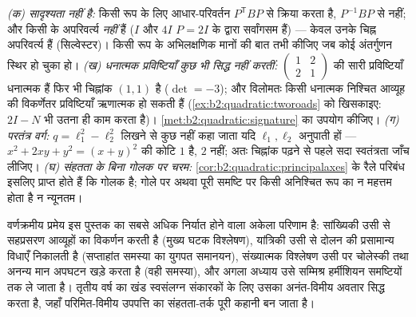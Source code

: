 \begin{remark}[सामान्य भूलें]
\emph{(क)  सादृश्यता नहीं है:} किसी रूप के लिए आधार-परिवर्तन
$P^{\mathsf T}BP$ से क्रिया करता है, $P^{-1}BP$ से नहीं; और  किसी  के
अपरिवर्त्य \emph{नहीं} हैं ($I$ और $4I$ $P = 2I$ के द्वारा सर्वांगसम हैं) ---
केवल उनके चिह्न अपरिवर्त्य हैं (सिल्वेस्टर)। किसी रूप के अभिलक्षणिक मानों
की बात तभी कीजिए जब कोई अंतर्गुणन स्थिर हो चुका हो। \emph{(ख) धनात्मक
प्रविष्टियाँ कुछ भी सिद्ध नहीं करतीं:} $\begin{pmatrix} 1 & 2\\ 2 & 1\end{pmatrix}$ की सारी प्रविष्टियाँ धनात्मक
हैं फिर भी चिह्नांक $(1,1)$ है ($\det = -3$); और विलोमतः किसी धनात्मक निश्चित आव्यूह
की विकर्णेतर प्रविष्टियाँ ऋणात्मक हो सकती हैं (\cref{ex:b2:quadratic:tworoads} को खिसकाइए: $2I - N$ भी उतना
ही काम करता है)। \cref{met:b2:quadratic:signature} का उपयोग कीजिए। \emph{(ग) परतंत्र वर्ग:} $q = \ell_1^2 - \ell_2^2$ लिखने
से कुछ नहीं कहा जाता यदि $\ell_1, \ell_2$ अनुपाती हों --- $x^2 + 2xy + y^2 =
(x+y)^2$ की कोटि $1$ है, $2$
नहीं; अतः चिह्नांक पढ़ने से पहले सदा स्वतंत्रता जाँच लीजिए। \emph{(घ)
संहतता के बिना गोलक पर चरम:} \cref{cor:b2:quadratic:principalaxes} के रैले परिबंध इसलिए प्राप्त होते हैं
कि गोलक  है;  गोले पर अथवा पूरी समष्टि पर किसी अनिश्चित रूप का न
महत्तम होता है न न्यूनतम।
\end{remark}

\begin{remark}[यह कहाँ काम आता है]
वर्णक्रमीय प्रमेय इस पुस्तक का सबसे अधिक निर्यात होने वाला अकेला परिणाम
है: सांख्यिकी उसी से सहप्रसरण आव्यूहों का विकर्णन करती है (मुख्य घटक
विश्लेषण), यांत्रिकी उसी से दोलन की प्रसामान्य विधाएँ निकालती है
(सप्ताहांत समस्या का युगपत समानयन), संख्यात्मक विश्लेषण उसी पर चोलेस्की
तथा अनन्य मान अपघटन खड़े करता है (वही समस्या), और अगला अध्याय उसे सम्मिश्र
हर्मीशियन समष्टियों तक ले जाता है। तृतीय वर्ष का खंड  स्वसंलग्न
संकारकों के लिए उसका अनंत-विमीय अवतार सिद्ध करता है, जहाँ परिमित-विमीय
उपपत्ति का संहतता-तर्क पूरी कहानी बन जाता है।
\end{remark}


